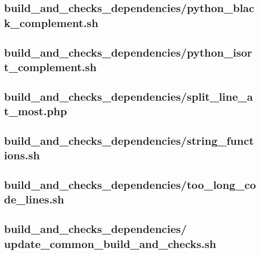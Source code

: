 \documentclass{article}
\begin{document}
\subsection{
  build\_and\_checks\_dependencies/python\_black\_complement.sh
}
\label{
  build_and_checks_dependencies:python_black_complementsh
}



\subsection{
  build\_and\_checks\_dependencies/python\_isort\_complement.sh
}
\label{
  build_and_checks_dependencies:python_isort_complementsh
}



\subsection{
  build\_and\_checks\_dependencies/split\_line\_at\_most.php
}
\label{
  build_and_checks_dependencies:split_line_at_mostphp
}



\subsection{
  build\_and\_checks\_dependencies/string\_functions.sh
}
\label{
  build_and_checks_dependencies:string_functionssh
}



\subsection{
  build\_and\_checks\_dependencies/too\_long\_code\_lines.sh
}
\label{
  build_and_checks_dependencies:too_long_code_linessh
}



\subsection{
  build\_and\_checks\_dependencies/%
update\_common\_build\_and\_checks.sh
}
\label{
  build_and_checks_dependencies:update_common_build_and_checkssh
}
\end{document}
